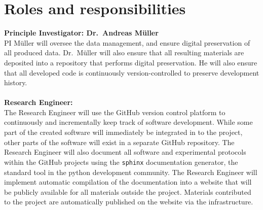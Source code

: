 











%

\section{Roles and responsibilities}

\textbf{Principle Investigator: Dr.\ Andreas M\"uller}\\
PI M\"uller will oversee the data management, and ensure digital preservation of
all produced data. Dr.\ M\"uller will also ensure that all resulting materials
are deposited into a repository that performs digital preservation.
He will also ensure that all developed code is continuously version-controlled to
preserve development history.
\\\\
\textbf{Research Engineer:}\\
The Research Engineer will use the GitHub version control platform to
continuously and incrementally keep track of software development. While some
part of the created software will immediately be integrated in to the
\sklearn{} project, other parts of the software will exist in a separate
GitHub repository. The Research Engineer will also document all software and
experimental protocols within the GitHub projects using the \texttt{sphinx}
documentation generator, the standard tool in the python development community.
The Research Engineer will implement automatic compilation of the documentation
into a website that will be publicly available for all materials outside the \sklearn{}
project. Materials contributed to the \sklearn{} project are automatically
published on the \sklearn{} website via the \sklearn{} infrastructure.

